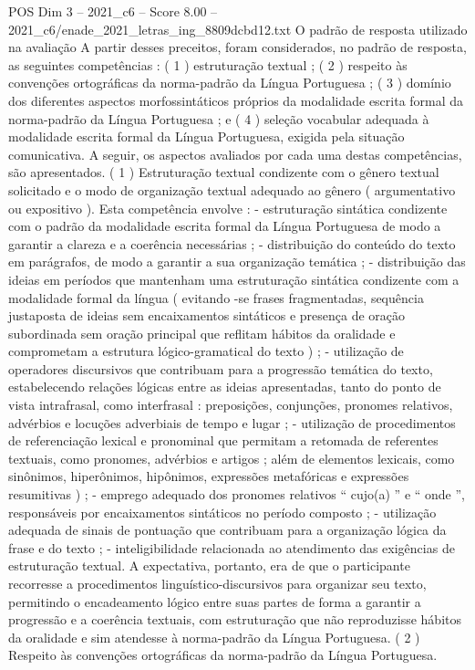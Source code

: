 \begin{textsample}{POS Dim 3 – 2021\_c6 – Score 8.00 – 2021\_c6/enade\_2021\_letras\_ing\_8809dcbd12.txt}
O padrão de resposta utilizado na avaliação A partir desses preceitos, foram considerados, no padrão de resposta, as seguintes competências : ( 1 ) estruturação textual ; ( 2 ) respeito às convenções ortográficas da norma-padrão da Língua Portuguesa ; ( 3 ) domínio dos diferentes aspectos morfossintáticos próprios da modalidade escrita formal da norma-padrão da Língua Portuguesa ; e ( 4 ) seleção vocabular adequada à modalidade escrita formal da Língua Portuguesa, exigida pela situação comunicativa.
A seguir, os aspectos avaliados por cada uma destas competências, são apresentados. ( 1 ) Estruturação textual condizente com o gênero textual solicitado e o modo de organização textual adequado ao gênero ( argumentativo ou expositivo ).
Esta competência envolve : - estruturação sintática condizente com o padrão da modalidade escrita formal da Língua Portuguesa de modo a garantir a clareza e a coerência necessárias ; - distribuição do conteúdo do texto em parágrafos, de modo a garantir a sua organização temática ; - distribuição das ideias em períodos que mantenham uma estruturação sintática condizente com a modalidade formal da língua ( evitando -se frases fragmentadas, sequência justaposta de ideias sem encaixamentos sintáticos e presença de oração subordinada sem oração principal que reflitam hábitos da oralidade e comprometam a estrutura lógico-gramatical do texto ) ; - utilização de operadores discursivos que contribuam para a progressão temática do texto, estabelecendo relações lógicas entre as ideias apresentadas, tanto do ponto de vista intrafrasal, como interfrasal : preposições, conjunções, pronomes relativos, advérbios e locuções adverbiais de tempo e lugar ; - utilização de procedimentos de referenciação lexical e pronominal que permitam a retomada de referentes textuais, como pronomes, advérbios e artigos ; além de elementos lexicais, como sinônimos, hiperônimos, hipônimos, expressões metafóricas e expressões resumitivas ) ; - emprego adequado dos pronomes relativos “ cujo(a) ” e “ onde ”, responsáveis por encaixamentos sintáticos no período composto ; - utilização adequada de sinais de pontuação que contribuam para a organização lógica da frase e do texto ; - inteligibilidade relacionada ao atendimento das exigências de estruturação textual.
A expectativa, portanto, era de que o participante recorresse a procedimentos linguístico-discursivos para organizar seu texto, permitindo o encadeamento lógico entre suas partes de forma a garantir a progressão e a coerência textuais, com estruturação que não reproduzisse hábitos da oralidade e sim atendesse à norma-padrão da Língua Portuguesa. ( 2 ) Respeito às convenções ortográficas da norma-padrão da Língua Portuguesa.

\end{textsample}
